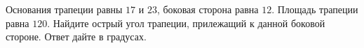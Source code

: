 \begin{ex}
	\begin{condition}
		Основания трапеции равны \( 17  \) и \( 23 \), боковая сторона равна \( 12 \). Площадь трапеции равна \( 120 \). Найдите острый угол трапеции, прилежащий к данной боковой стороне. Ответ дайте в градусах.
	\end{condition}
\end{ex}